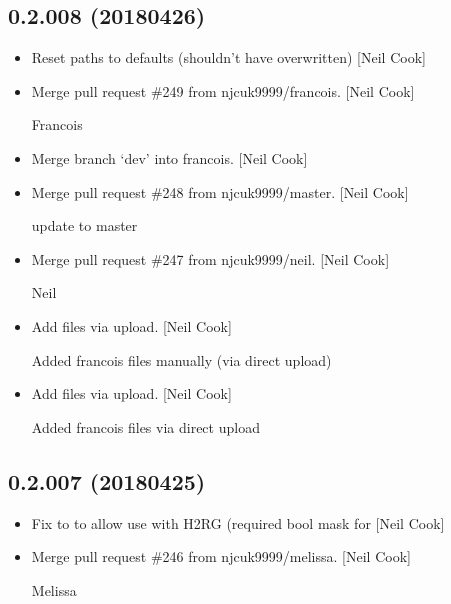 \documentclass[a4paper,10pt,english]{report}
\begin{document}
\subsection{0.2.008 (2018\sphinxhyphen{}04\sphinxhyphen{}26)}
\label{\detokenize{misc/changelog:id472}}\begin{itemize}
\item {} 
Reset paths to defaults (shouldn’t have overwritten) {[}Neil Cook{]}

\item {} 
Merge pull request \#249 from njcuk9999/francois. {[}Neil Cook{]}

Francois

\item {} 
Merge branch ‘dev’ into francois. {[}Neil Cook{]}

\item {} 
Merge pull request \#248 from njcuk9999/master. {[}Neil Cook{]}

update to master

\item {} 
Merge pull request \#247 from njcuk9999/neil. {[}Neil Cook{]}

Neil

\item {} 
Add files via upload. {[}Neil Cook{]}

Added francois files manually (via direct upload)

\item {} 
Add files via upload. {[}Neil Cook{]}

Added francois files via direct upload

\end{itemize}


\subsection{0.2.007 (2018\sphinxhyphen{}04\sphinxhyphen{}25)}
\label{\detokenize{misc/changelog:id473}}\begin{itemize}
\item {} 
Fix to  to allow use with H2RG (required bool mask for
 {[}Neil Cook{]}

\item {} 
Merge pull request \#246 from njcuk9999/melissa. {[}Neil Cook{]}

Melissa

\end{itemize}
\end{document}
